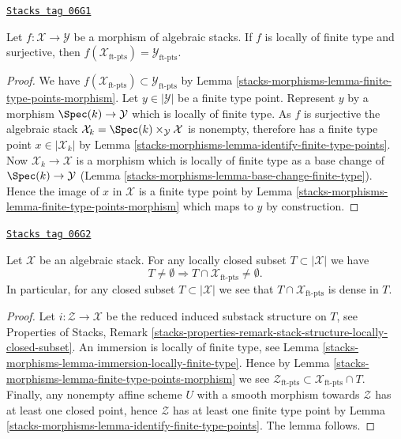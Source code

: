 \begin{lemma}
\label{stacks-morphisms-lemma-finite-type-points-surjective-morphism}
\href{https://stacks.math.columbia.edu/tag/06G1}{\texttt{Stacks tag 06G1}}

Let $f : \mathcal{X} \to \mathcal{Y}$ be a morphism of algebraic stacks.
If $f$ is locally of finite type and surjective, then
$f(\mathcal{X}_{\text{ft-pts}}) = \mathcal{Y}_{\text{ft-pts}}$.
\end{lemma}

\begin{proof}
We have $f(\mathcal{X}_{\text{ft-pts}}) \subset \mathcal{Y}_{\text{ft-pts}}$ by
Lemma \ref{stacks-morphisms-lemma-finite-type-points-morphism}.
Let $y \in |\mathcal{Y}|$ be a finite type point. Represent $y$ by a morphism
$\Spec(k) \to \mathcal{Y}$ which is locally of finite type.
As $f$ is surjective the algebraic stack
$\mathcal{X}_k = \Spec(k) \times_\mathcal{Y} \mathcal{X}$ is nonempty,
therefore has a finite type point $x \in |\mathcal{X}_k|$ by
Lemma \ref{stacks-morphisms-lemma-identify-finite-type-points}.
Now $\mathcal{X}_k \to \mathcal{X}$ is a morphism which is locally of finite
type as a base change of $\Spec(k) \to \mathcal{Y}$
(Lemma \ref{stacks-morphisms-lemma-base-change-finite-type}).
Hence the image of $x$ in $\mathcal{X}$ is a finite type point by
Lemma \ref{stacks-morphisms-lemma-finite-type-points-morphism}
which maps to $y$ by construction.
\end{proof}

\begin{lemma}
\label{stacks-morphisms-lemma-enough-finite-type-points}
\href{https://stacks.math.columbia.edu/tag/06G2}{\texttt{Stacks tag 06G2}}

Let $\mathcal{X}$ be an algebraic stack.
For any locally closed subset $T \subset |\mathcal{X}|$ we have
$$
T \not = \emptyset
\Rightarrow
T \cap \mathcal{X}_{\text{ft-pts}} \not = \emptyset.
$$
In particular, for any closed subset $T \subset |\mathcal{X}|$ we
see that $T \cap \mathcal{X}_{\text{ft-pts}}$ is dense in $T$.
\end{lemma}

\begin{proof}
Let $i : \mathcal{Z} \to \mathcal{X}$ be the reduced induced substack
structure on $T$, see
Properties of Stacks,
Remark \ref{stacks-properties-remark-stack-structure-locally-closed-subset}.
An immersion is locally of finite type, see
Lemma \ref{stacks-morphisms-lemma-immersion-locally-finite-type}.
Hence by
Lemma \ref{stacks-morphisms-lemma-finite-type-points-morphism}
we see
$\mathcal{Z}_{\text{ft-pts}} \subset \mathcal{X}_{\text{ft-pts}} \cap T$.
Finally, any nonempty affine scheme $U$ with a smooth morphism towards
$\mathcal{Z}$ has at least one closed point, hence $\mathcal{Z}$ has at least
one finite type point by
Lemma \ref{stacks-morphisms-lemma-identify-finite-type-points}.
The lemma follows.
\end{proof}

